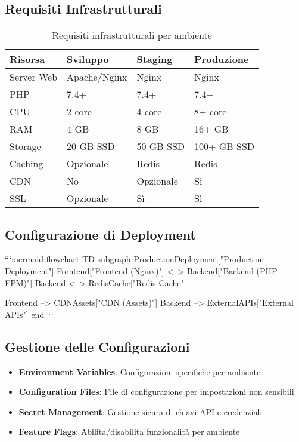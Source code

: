 \subsection{Requisiti Infrastrutturali}
\begin{table}[H]
\centering
\begin{tabular}{|l|l|l|l|}
\hline
\textbf{Risorsa} & \textbf{Sviluppo} & \textbf{Staging} & \textbf{Produzione} \\
\hline
Server Web & Apache/Nginx & Nginx & Nginx \\
\hline
PHP & 7.4+ & 7.4+ & 7.4+ \\
\hline
CPU & 2 core & 4 core & 8+ core \\
\hline
RAM & 4 GB & 8 GB & 16+ GB \\
\hline
Storage & 20 GB SSD & 50 GB SSD & 100+ GB SSD \\
\hline
Caching & Opzionale & Redis & Redis \\
\hline
CDN & No & Opzionale & Sì \\
\hline
SSL & Opzionale & Sì & Sì \\
\hline
\end{tabular}
\caption{Requisiti infrastrutturali per ambiente}
\label{table:infrastructure-requirements}
\end{table}

\subsection{Configurazione di Deployment}

```mermaid
flowchart TD
    subgraph ProductionDeployment["Production Deployment"]
        Frontend["Frontend (Nginx)"] <--> Backend["Backend (PHP-FPM)"]
        Backend <--> RedisCache["Redis Cache"]
        
        Frontend --> CDNAssets["CDN (Assets)"]
        Backend --> ExternalAPIs["External APIs"]
    end
```

\subsection{Gestione delle Configurazioni}
\begin{itemize}
    \item \textbf{Environment Variables}: Configurazioni specifiche per ambiente
    \item \textbf{Configuration Files}: File di configurazione per impostazioni non sensibili
    \item \textbf{Secret Management}: Gestione sicura di chiavi API e credenziali
    \item \textbf{Feature Flags}: Abilita/disabilita funzionalità per ambiente
\end{itemize}

